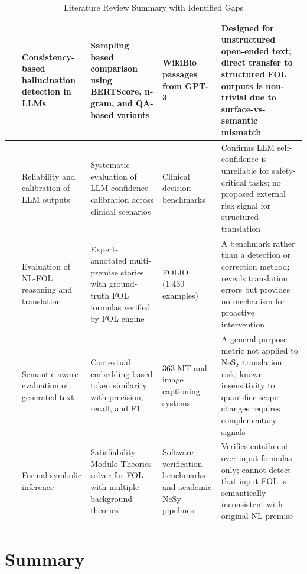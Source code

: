 \begin{table}[h]
{\begin{tabular}{|p{3.5cm}|p{3cm}|p{3cm}|p{3cm}|p{4.5cm}|}
\hline
~\cite{manakul2023selfcheck}& Consistency-based hallucination detection in LLMs & Sampling based comparison using BERTScore, n-gram, and QA-based variants& WikiBio passages from GPT-3 & Designed for unstructured open-ended text; direct transfer to structured FOL outputs is non-trivial due to surface-vs-semantic mismatch \\
\hline
~\cite{savage2024do}& Reliability and calibration of LLM outputs & Systematic evaluation of LLM confidence calibration across clinical scenarios & Clinical decision benchmarks & Confirms LLM self-confidence is unreliable for safety-critical tasks; no proposed external risk signal for structured translation \\
\hline
~\cite{han2024folio}& Evaluation of NL-FOL reasoning and translation & Expert-annotated multi-premise stories with ground-truth FOL formulas verified by FOL engine & FOLIO (1,430 examples) & A benchmark rather than a detection or correction method; reveals translation errors but provides no mechanism for proactive intervention \\
\hline
~\cite{zhang2020bertscore}& Semantic-aware evaluation of generated text & Contextual embedding-based token similarity with precision, recall, and F1 & 363 MT and image captioning systems & A general purpose metric not applied to NeSy translation risk; known insensitivity to quantifier scope changes requires complementary signals\\
\hline
~\cite{demoura2008z3}& Formal symbolic inference & Satisfiability Modulo Theories solver for FOL with multiple background theories & Software verification benchmarks and academic NeSy pipelines & Verifies entailment over input formulas only; cannot detect that input FOL is semantically inconsistent with original NL premise\\
\hline
\end{tabular}%
}
\caption{Literature Review Summary with Identified Gaps}
\end{table}

\section{Summary}

